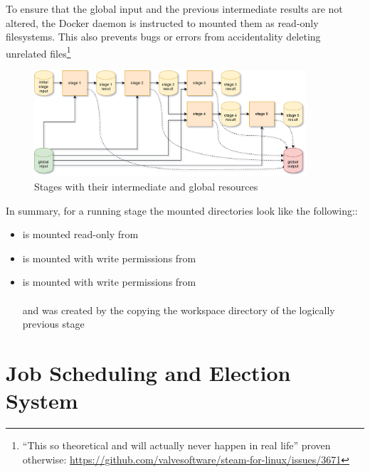 To ensure that the global input and the previous intermediate results are not altered, the Docker daemon is instructed to mounted them as read-only filesystems.
This also prevents bugs or errors from accidentality deleting unrelated files\footnote{\enquote{This so theoretical and will actually never happen in real life} proven otherwise: \url{https://github.com/valvesoftware/steam-for-linux/issues/3671}}


\begin{figure}[H]
	\centering
	\includegraphics[width=0.9\textwidth]{stage-storage.png}
	\caption{Stages with their intermediate and global resources}
\end{figure}

In summary, for a running stage the mounted directories look like the following::

\begin{itemize}
	\item {} is mounted read-only from \\ 
	\item {} is mounted with write permissions from \\ 
	\item {} is mounted with write permissions from \\  \\
	and was created by the copying the workspace directory of the logically previous stage
\end{itemize}





\section{Job Scheduling and Election System}
\label{design:election}


